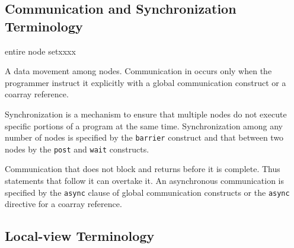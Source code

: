 \subsection{Communication and Synchronization Terminology}

\begin{namelist}{entire node setxxxx}


 A data movement among nodes. Communication in {\XMP} occurs only when
 the programmer instruct it explicitly with a global communication
 construct or a coarray reference.


 Synchronization is a mechanism to ensure that multiple nodes do not
 execute specific portions of a program at the same
 time. Synchronization among any number of nodes is specified by the
 {\tt barrier} construct and that between two nodes by the {\tt post} and
 {\tt wait} constructs.


 Communication that does not block and returns before it is
 complete. Thus statements that follow it can overtake it. An
 asynchronous communication is specified by the {\tt async} clause of
 global communication constructs or the {\tt async} directive for
 a coarray reference.

\end{namelist}

\subsection{Local-view Terminology}

